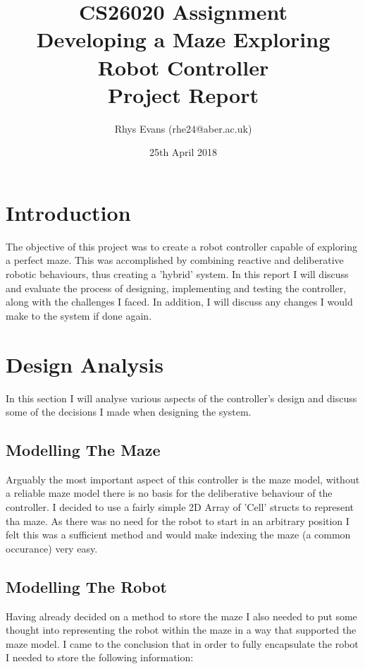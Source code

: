 \documentclass[a4paper]{article}
\begin{document}
	\title{CS26020 Assignment \\ Developing a Maze Exploring Robot Controller \\ Project Report}
	\author{Rhys Evans (rhe24@aber.ac.uk)}
	\date{25th April 2018}
	\maketitle
	\newpage
	\tableofcontents
	\newpage
	
	\section{Introduction}
	The objective of this project was to create a robot controller capable of exploring a perfect maze. This was accomplished by combining reactive and deliberative robotic behaviours, thus creating a 'hybrid' system. In this report I will discuss and evaluate the process of designing, implementing and testing the controller, along with the challenges I faced. In addition, I will discuss any changes I would make to the system if done again.
	
	\section{Design Analysis}
	In this section I will analyse various aspects of the controller's design and discuss some of the decisions I made when designing the system.
	
	\subsection{Modelling The Maze}
	Arguably the most important aspect of this controller is the maze model, without a reliable maze model there is no basis for the deliberative behaviour of the controller. I decided to use a fairly simple 2D Array of 'Cell' structs to represent tha maze. As there was no need for the robot to start in an arbitrary position I felt this was a sufficient method and would make indexing the maze (a common occurance) very easy.
	
	\subsection{Modelling The Robot}
	Having already decided on a method to store the maze I also needed to put some thought into representing the robot within the maze in a way that supported the maze model. I came to the conclusion that in order to fully encapsulate the robot I needed to store the following information:\\
	
\end{document}
